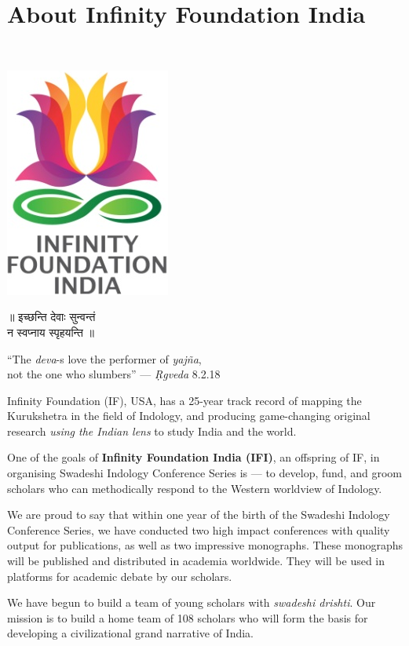 \thispagestyle{empty}

\chapter*{About Infinity Foundation India}

~
\vskip -30pt

\centerline{\includegraphics[scale=0.23]{figures/logo.png}}\label{about}

\begin{center}
{\dev ॥ इच्छन्ति  देवाः सुन्वन्तं\\[2pt] \hspace{7mm} न स्वप्नाय स्पृहयन्ति ॥}

``The {\sl deva}-s love the performer of {\sl yajña},\\ 
not the one who slumbers'' --- \textsl{Ṛgveda} 8.2.18
\end{center} 

Infinity Foundation (IF), USA, has a 25-year track record of mapping the Kurukshetra in the field of Indology, and producing game-changing original research {\sl using the Indian lens} to study India and the world. 

One of the goals of {\bf Infinity Foundation India (IFI)}, an offspring of IF, in organising Swadeshi Indology Conference Series is --- to develop, fund, and groom scholars who can methodically respond to the Western worldview of Indology.

We are proud to say that within one year of the birth of the Swadeshi Indology Conference Series, we have conducted two high impact conferences with quality output for publications, as well as two impressive monographs. These monographs will be published and distributed in academia worldwide. They will be used in platforms for academic debate by our scholars.

We have begun to build a team of young scholars with {\sl swadeshi drishti}. Our mission is to build a home team of 108 scholars who will form the basis for developing a civilizational grand narrative of India.
